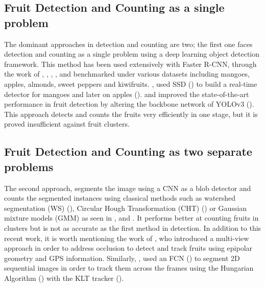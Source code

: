 \subsection{Fruit Detection and Counting as a single problem}
The dominant approaches in detection and counting are two; the first one faces detection and counting as a single problem using a deep learning object detection framework. This method has been used extensively with Faster R-CNN, through the work of \cite{bargoti2017deep}, \cite{sa2016deepfruits}, \cite{mai2018faster}, \cite{fu2018kiwifruit}, \cite{gene2019multi} and benchmarked under various datasets including mangoes, apples, almonds, sweet peppers and kiwifruits. \cite{liang2018real}, used SSD (\cite{liu2016ssd}) to build a real-time detector for mangoes and later on apples (\cite{liang2018apple}). \cite{tian2019apple} and \cite{koirala2019deep} improved the state-of-the-art performance in fruit detection by altering the backbone network of YOLOv3 (\cite{redmon2018yolov3}). This approach detects and counts the fruits very efficiently in one stage, but it is proved insufficient against fruit clusters. 

\subsection{Fruit Detection and Counting as two separate problems}
The second approach, segments the image using a CNN as a blob detector and counts the segmented instances using classical methods such as watershed segmentation (WS) (\cite{beucher1992watershed}), Circular Hough Transformation (CHT) (\cite{atherton1999size}) or Gaussian mixture models (GMM) as seen in \cite{hani2018comparative}, \cite{bargoti2017image} and  \cite{chen2017counting}. It performs better at counting fruits in clusters but is not as accurate as the first method in detection. In addition to this recent work, it is worth mentioning the work of \cite{stein2016image}, who introduced a multi-view approach in order to address occlusion to detect and track fruits using epipolar geometry and GPS information. Similarly, \cite{liu2018robust}, used an FCN (\cite{long2015fully}) to segment 2D sequential images in order to track them across the frames using the Hungarian Algorithm (\cite{kuhn1955hungarian}) with the KLT tracker (\cite{lucas1981iterative}).

